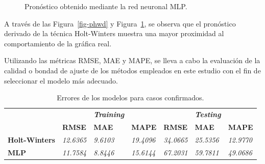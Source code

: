 \documentclass[
  us-letterpaper,
]{scrreprt}
\theoremstyle{plain}
\theoremstyle{definition}
\theoremstyle{definition}
\theoremstyle{plain}
\theoremstyle{remark}
\begin{document}
\begin{figure}


\caption{\label{fig-pmlpd}Pronóstico obtenido mediante la red neuronal
MLP.}

\end{figure}%

A través de las Figura~\ref{fig-phwd} y Figura~\ref{fig-pmlpd}, se
observa que el pronóstico derivado de la técnica Holt-Winters muestra
una mayor proximidad al comportamiento de la gráfica real.

Utilizando las métricas RMSE, MAE y MAPE, se lleva a cabo la evaluación
de la calidad o bondad de ajuste de los métodos empleados en este
estudio con el fin de seleccionar el modelo más adecuado.

\begin{longtable}[]{@{}
  >{\raggedright\arraybackslash}p{}
  >{\centering\arraybackslash}p{}
  >{\centering\arraybackslash}p{}
  >{\centering\arraybackslash}p{}
  >{\centering\arraybackslash}p{}
  >{\centering\arraybackslash}p{}
  >{\centering\arraybackslash}p{}@{}}
\caption{Errores de los modelos para casos
confirmados.}\label{tbl-errd}\tabularnewline
\toprule\noalign{}
\endfirsthead
\endhead
\bottomrule\noalign{}
\endlastfoot
& & \textbf{\emph{Training}} & & & \textbf{\emph{Testing}} & \\
& \textbf{RMSE} & \textbf{MAE} & \textbf{MAPE} & \textbf{RMSE} &
\textbf{MAE} & \textbf{MAPE} \\
\textbf{Holt-Winters} & \emph{12.6365} & \emph{9.6103} & \emph{19.4096}
& \emph{34.0665} & \emph{25.5356} & \emph{12.9770} \\
\textbf{MLP} & \emph{11.7584} & \emph{8.8446} & \emph{15.6144} &
\emph{67.2031} & \emph{59.7811} & \emph{49.0686} \\
\end{longtable}
\end{document}
